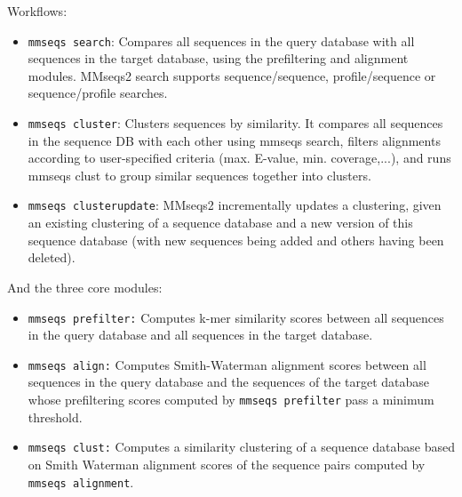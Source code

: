 \documentclass[11pt,a4paper]{scrreprt}
\begin{document}
Workflows:
\begin{itemize}
\item \texttt{mmseqs search}: Compares all sequences in the query database with all sequences in the target database, using the prefiltering and alignment modules. MMseqs2 search supports sequence/sequence, profile/sequence or sequence/profile searches.
\item \texttt{mmseqs cluster}:  Clusters sequences by similarity. It compares all sequences in the sequence DB with each other using mmseqs search, filters alignments according to user-specified criteria (max. E-value, min. coverage,...),   and runs mmseqs clust to group similar sequences together into clusters.
\item \texttt{mmseqs clusterupdate}: MMseqs2 incrementally updates a clustering, given an existing clustering of a sequence database and a new version of this sequence database (with new sequences being added and others having been deleted).
\end{itemize}


And the three core modules:
\begin{itemize}
\item \texttt{mmseqs prefilter:} Computes k-mer similarity scores between all sequences in the query database and all sequences in the target database.
\item \texttt{mmseqs align:} Computes Smith-Waterman alignment scores between all sequences in the query database and the sequences of the target database whose prefiltering scores computed by \texttt{mmseqs prefilter} pass a minimum threshold.
\item \texttt{mmseqs clust:} Computes a similarity clustering of a sequence database based on Smith Waterman alignment scores of the sequence pairs computed by \texttt{mmseqs alignment}.
\end{itemize}
\end{document}
